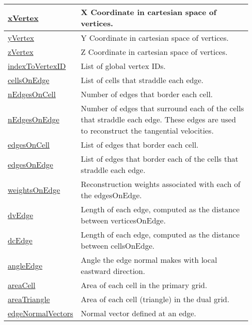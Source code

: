 {\begin{center}
\begin{longtable}{| p{2.0in} | p{4.0in} |}
	\hline
	\hyperref[subsec:var_sec_mesh_xVertex]{xVertex} & X Coordinate in cartesian space of vertices. \\
	\hline
	\hyperref[subsec:var_sec_mesh_yVertex]{yVertex} & Y Coordinate in cartesian space of vertices. \\
	\hline
	\hyperref[subsec:var_sec_mesh_zVertex]{zVertex} & Z Coordinate in cartesian space of vertices. \\
	\hline
	\hyperref[subsec:var_sec_mesh_indexToVertexID]{indexToVertexID} & List of global vertex IDs. \\
	\hline
	\hyperref[subsec:var_sec_mesh_cellsOnEdge]{cellsOnEdge} & List of cells that straddle each edge. \\
	\hline
	\hyperref[subsec:var_sec_mesh_nEdgesOnCell]{nEdgesOnCell} & Number of edges that border each cell. \\
	\hline
	\hyperref[subsec:var_sec_mesh_nEdgesOnEdge]{nEdgesOnEdge} & Number of edges that surround each of the cells that straddle each edge. These edges are used to reconstruct the tangential velocities. \\
	\hline
	\hyperref[subsec:var_sec_mesh_edgesOnCell]{edgesOnCell} & List of edges that border each cell. \\
	\hline
	\hyperref[subsec:var_sec_mesh_edgesOnEdge]{edgesOnEdge} & List of edges that border each of the cells that straddle each edge. \\
	\hline
	\hyperref[subsec:var_sec_mesh_weightsOnEdge]{weightsOnEdge} & Reconstruction weights associated with each of the edgesOnEdge. \\
	\hline
	\hyperref[subsec:var_sec_mesh_dvEdge]{dvEdge} & Length of each edge, computed as the distance between verticesOnEdge. \\
	\hline
	\hyperref[subsec:var_sec_mesh_dcEdge]{dcEdge} & Length of each edge, computed as the distance between cellsOnEdge. \\
	\hline
	\hyperref[subsec:var_sec_mesh_angleEdge]{angleEdge} & Angle the edge normal makes with local eastward direction. \\
	\hline
	\hyperref[subsec:var_sec_mesh_areaCell]{areaCell} & Area of each cell in the primary grid. \\
	\hline
	\hyperref[subsec:var_sec_mesh_areaTriangle]{areaTriangle} & Area of each cell (triangle) in the dual grid. \\
	\hline
	\hyperref[subsec:var_sec_mesh_edgeNormalVectors]{edgeNormalVectors} & Normal vector defined at an edge. \\
	\hline

\end{longtable}
\end{center}}
